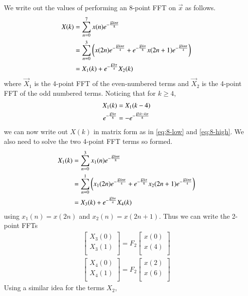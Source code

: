 \documentclass[journal,12pt,twocolumn]{IEEEtran}
\renewcommand\thesection{\arabic{section}}
\begin{document}
\begin{enumerate}[label=\thesection.\arabic*.,ref=\thesection.\theenumi]
\solution We write out the values of performing an 8-point FFT on $\vec{x}$ as follows.
\begin{align}
	X(k) &= \sum_{n = 0}^{7}x(n)e^{-\frac{\mathbf{j}2kn\pi}{8}} \\
		 &= \sum_{n = 0}^{3}\left(x(2n)e^{-\frac{\mathbf{j}2kn\pi}{4}} + e^{-\frac{\mathbf{j}2k\pi}{8}}x(2n + 1)e^{-\frac{\mathbf{j}2kn\pi}{4}}\right) \\
		 &= X_1(k) + e^{-\frac{\mathbf{j}2k\pi}{4}}X_2(k) 
\end{align}
where $\vec{X}_1$ is the 4-point FFT of the even-numbered terms and $\vec{X}_2$ is the 4-point FFT of the odd numbered terms. Noticing that for $k \geq 4$,
\begin{align}
	X_1(k) &= X_1(k - 4) \\
	e^{-\frac{\mathbf{j}2k\pi}{8}} &= -e^{-\frac{\mathbf{j}2(k - 4)\pi}{8}}
\end{align}
we can now write out $X(k)$ in matrix form as in \eqref{eq:8-low} and \eqref{eq:8-high}. We also need to solve the two 4-point FFT terms so formed.
\begin{align}
	X_1(k) &= \sum_{n = 0}^{3}x_1(n)e^{-\frac{\mathbf{j}2kn\pi}{8}} \\
		 &= \sum_{n = 0}^{1}\left(x_1(2n)e^{-\frac{\mathbf{j}2kn\pi}{4}} + e^{-\frac{\mathbf{j}2k\pi}{8}}x_2(2n + 1)e^{-\frac{\mathbf{j}2kn\pi}{4}}\right) \\
		 &= X_3(k) + e^{-\frac{\mathbf{j}2k\pi}{4}}X_4(k) 
\end{align}
using $x_1(n) = x(2n)$ and $x_2(n) = x(2n + 1)$. Thus we can write the 2-point FFTs
\begin{align}
\begin{bmatrix}
X_{3}(0) \\ 
X_{3}(1)\\ 
\end{bmatrix}
= F_{2}
\begin{bmatrix}
x(0) \\ 
x(4) \\ 
\end{bmatrix} \\
\begin{bmatrix}
X_{4}(0) \\ 
X_{4}(1)\\ 
\end{bmatrix}
= F_{2}
\begin{bmatrix}
x(2) \\ 
x(6) \\ 
\end{bmatrix}
\end{align}
Using a similar idea for the terms $X_2$, 
\begin{align}

\end{align}
\end{enumerate}
\end{document}
